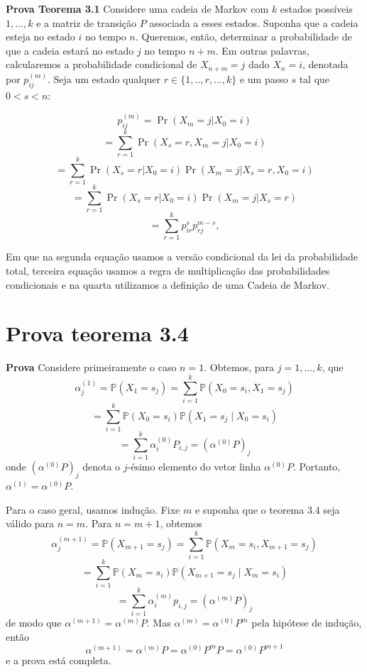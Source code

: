 \documentclass[12pt, a4paper, openany]{book}
\numberwithin{equation}{chapter}
\numberwithin{table}{chapter}
\numberwithin{figure}{chapter}
\theoremstyle{break}
\begin{document}



\textbf{Prova Teorema 3.1}
Considere uma cadeia de Markov com \( k \) estados possíveis \(1, \dots, k\) e a matriz de transição \( P \) associada a esses estados. Suponha que a cadeia esteja no estado \( i \) no tempo \( n \). Queremos, então, determinar a probabilidade de que a cadeia estará no estado \( j \) no tempo \( n+m\). Em outras palavras, calcularemos a probabilidade condicional de \( X_{n+m} = j \) dado \( X_n = i \), denotada por \( p_{ij}^{(m)} \). Seja um estado qualquer $r \in \{1,..,r,...,k\}$ e um passo $s$ tal que $0 < s < n$: 



\[
p_{ij}^{(m)} = \Pr(X_{m} = j | X_0 = i)
\]
\[
= \sum_{r=1}^{k} \Pr(X_{s} = r , X_{m} = j | X_0 = i)
\]
\[
= \sum_{r=1}^{k} \Pr(X_{s} = r | X_0 = i) \Pr(X_{m} = j | X_{s} = r, X_0 = i)
\]
\[
= \sum_{r=1}^{k} \Pr(X_{s} = r | X_0 = i) \Pr(X_{m} = j | X_{s} = r)
\]
\[
= \sum_{r=1}^{k} p_{ir}^{s} p_{rj}^{m-s},
\]


Em que na segunda equação usamos a versão condicional da lei da probabilidade total,  terceira equação usamos a regra de multiplicação das probabilidades condicionais  e na quarta utilizamos a definição de uma Cadeia de Markov.

\section{Prova teorema 3.4}



\textbf{Prova} Considere primeiramente o caso \( n = 1 \). Obtemos, para \( j = 1, \ldots, k \), que
\[
\alpha_j^{(1)} = \mathbb{P}(X_1 = s_j) = \sum_{i=1}^k \mathbb{P}(X_0 = s_i, X_1 = s_j)
\]
\[
= \sum_{i=1}^k \mathbb{P}(X_0 = s_i) \mathbb{P}(X_1 = s_j \mid X_0 = s_i)
\]
\[
= \sum_{i=1}^k \alpha_i^{(0)} P_{i,j} = (\alpha^{(0)} P)_j
\]
onde \( (\alpha^{(0)} P)_j \) denota o \( j \)-ésimo elemento do vetor linha \( \alpha^{(0)} P \). Portanto, \( \alpha^{(1)} = \alpha^{(0)} P \).

Para o caso geral, usamos indução. Fixe \( m \) e suponha que o teorema 3.4 seja válido para \( n = m \). Para \( n = m + 1 \), obtemos
\[
\alpha_j^{(m+1)} = \mathbb{P}(X_{m+1} = s_j) = \sum_{i=1}^k \mathbb{P}(X_m = s_i, X_{m+1} = s_j)
\]
\[
= \sum_{i=1}^k \mathbb{P}(X_m = s_i) \mathbb{P}(X_{m+1} = s_j \mid X_m = s_i)
\]
\[
= \sum_{i=1}^k \alpha_i^{(m)} p_{i,j} = (\alpha^{(m)} P)_j
\]
de modo que \( \alpha^{(m+1)} = \alpha^{(m)} P \). Mas \( \alpha^{(m)} = \alpha^{(0)} P^m \) pela hipótese de indução, então
\[
\alpha^{(m+1)} = \alpha^{(m)} P = \alpha^{(0)} P^m P = \alpha^{(0)} P^{m+1}
\]
e a prova está completa.
\end{document}
